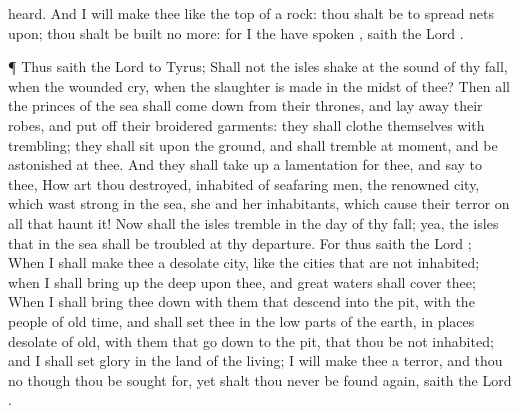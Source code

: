 {heard.
And I will
make thee like the
top of a
rock: thou shalt be
{} to
spread
nets
upon; thou shalt be
built no more: for I the
{} have
spoken
{},
saith the
Lord
{}.
\par }{\PP {}¶ Thus
saith the
Lord
{} to
Tyrus; Shall not the
isles
shake at the
sound of thy
fall, when the
wounded
cry, when the
slaughter is
made in the
midst of thee?
Then all the
princes of the
sea shall come
down from their
thrones, and lay
away their
robes, and put
off their
broidered
garments: they shall
clothe themselves with
trembling; they shall
sit upon the
ground, and shall
tremble at
{}
moment, and be
astonished at thee.
And they shall take
up a
lamentation for thee, and
say to thee, How art thou
destroyed,
{}
inhabited of seafaring
men, the
renowned
city, which wast
strong in the
sea, she and her
inhabitants, which
cause their
terror
{} on all that
haunt it!
Now shall the
isles
tremble in the
day of thy
fall; yea, the
isles that
{} in the
sea shall be
troubled at thy
departure.
For thus
saith the
Lord
{}; When I shall
make thee a
desolate
city, like the
cities that are not
inhabited; when I shall bring
up the
deep upon thee, and
great
waters shall
cover thee;
When I shall bring thee
down with them that
descend into the
pit, with the
people of old
time, and shall
set thee in the low
parts of the
earth, in places
desolate of
old, with them that go
down to the
pit, that thou be not
inhabited; and I shall
set
glory in the
land of the
living;
I will
make thee a
terror, and thou
{} no
{} though thou be sought
for, yet shalt thou
never be
found again,
saith the
Lord
{}.

}

